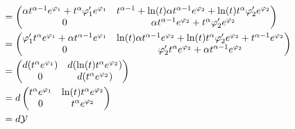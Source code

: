 \begin{rem}
\begin{align*}
    \\&=\begin{pmatrix}
      \alpha t^{\alpha-1}e^{\varphi_1} + t^\alpha\varphi_1'e^{\varphi_1} 
    & t^{\alpha-1}+\ln(t)\alpha t^{\alpha-1}e^{\varphi_2}
      + \ln(t)t^\alpha\varphi_2'e^{\varphi_2}
      \\ 0 & \alpha t^{\alpha-1}e^{\varphi_2} + t^\alpha\varphi_2'e^{\varphi_2}
    \end{pmatrix}
    \\&=\begin{pmatrix}
      \varphi_1' t^\alpha e^{\varphi_1} +\alpha t^{\alpha-1} e^{\varphi_1} 
      &
      \ln(t)\alpha t^{\alpha-1}e^{\varphi_2}
      +\ln(t)t^\alpha\varphi_2'e^{\varphi_2}
      +t^{\alpha-1} e^{\varphi_2}
      \\0 & \varphi_2' t^\alpha e^{\varphi_2}+\alpha t^{\alpha-1} e^{\varphi_2}
    \end{pmatrix}
    \\&=\begin{pmatrix}
      d(t^\alpha e^{\varphi_1}) & d(\ln(t)t^\alpha e^{\varphi_2})
      \\0 & d(t^\alpha e^{\varphi_2})
    \end{pmatrix}
    \\&=d\begin{pmatrix}
      t^\alpha e^{\varphi_1} & \ln(t)t^\alpha e^{\varphi_2}
      \\0 & t^\alpha e^{\varphi_2}
    \end{pmatrix}
    \\&=d\mathcal{Y}
  \end{align*}
\end{rem}

